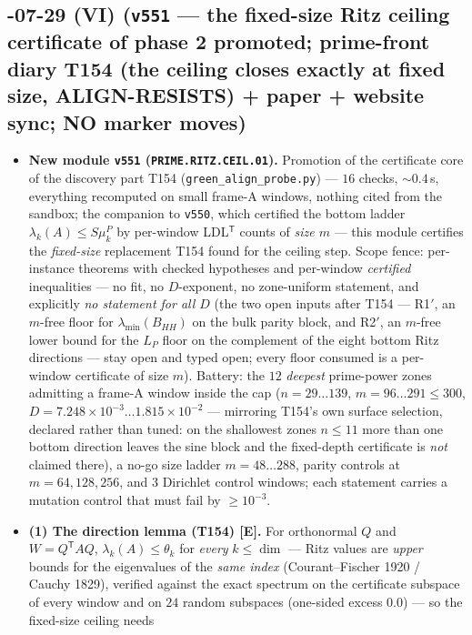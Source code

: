 \documentclass[11pt]{article}
\providecommand{\mE}{\textbf{[E]}}\providecommand{\mC}{\textbf{[C]}}
\begin{document}
\subsection*{-07-29 (VI) (\texttt{v551} --- the fixed-size Ritz ceiling certificate of phase 2 promoted; prime-front diary T154 (the ceiling closes exactly at fixed size, ALIGN-RESISTS) + paper + website sync; NO marker moves)}
\begin{itemize}[leftmargin=1.5em]
\item \textbf{New module \texttt{v551} (\texttt{PRIME.RITZ.CEIL.01}).} Promotion of the
certificate core of the discovery part T154 (\texttt{green\_align\_probe.py}) --- $16$ checks,
${\sim}0.4$\,s, everything recomputed on small frame-A windows, nothing cited from the sandbox;
the companion to \texttt{v550}, which certified the bottom ladder
$\lambda_k(A)\le S\mu^P_k$ by per-window LDL$^{\mathsf T}$ counts of \emph{size $m$} --- this
module certifies the \emph{fixed-size} replacement T154 found for the ceiling step. Scope
fence: per-instance theorems with checked hypotheses and per-window \emph{certified}
inequalities --- no fit, no $D$-exponent, no zone-uniform statement, and explicitly \emph{no
statement for all $D$} (the two open inputs after T154 --- R1$'$, an $m$-free floor for
$\lambda_{\min}(B_{HH})$ on the bulk parity block, and R2$'$, an $m$-free lower bound for the
$L_P$ floor on the complement of the eight bottom Ritz directions --- stay open and typed
open; every floor consumed is a per-window certificate of size $m$). Battery: the $12$
\emph{deepest} prime-power zones admitting a frame-A window inside the cap ($n=29\ldots139$,
$m=96\ldots291\le300$, $D=7.248\times10^{-3}\ldots1.815\times10^{-2}$ --- mirroring T154's own
surface selection, declared rather than tuned: on the shallowest zones $n\le11$ more than one
bottom direction leaves the sine block and the fixed-depth certificate is \emph{not} claimed
there), a no-go size ladder $m=48\ldots288$, parity controls at $m=64,128,256$, and $3$
Dirichlet control windows; each statement carries a mutation control that must fail by
$\ge10^{-3}$.
\item \textbf{(1) The direction lemma (T154) \mE.} For orthonormal $Q$ and
$W=Q^{\mathsf T}AQ$, $\lambda_k(A)\le\theta_k$ for \emph{every} $k\le\dim$ --- Ritz values are
\emph{upper} bounds for the eigenvalues of the \emph{same index} (Courant--Fischer 1920 /
Cauchy 1829), verified against the exact spectrum on the certificate subspace of every window
and on $24$ random subspaces (one-sided excess $0.0$) --- so the fixed-size ceiling needs

\end{itemize}
\end{document}
